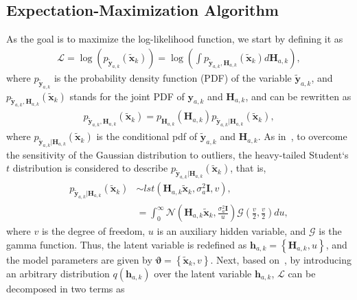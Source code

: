 \documentclass[conference,twocolumn,a4paper]{IEEEtran}
\theoremstyle{remark} \newtheorem{remark}{Remark}
\begin{document}
\subsection{Expectation-Maximization Algorithm}
As the goal is to maximize the log-likelihood function, we start by defining it as
\begin{align}\label{eq:likelihood}
    \mathcal{L}\!=\!\log \left(p_{\tilde{\mathbf{y}}_{a,k}}\!({\tilde{\mathbf{x}}_k})\right)\!=\!\log\!\!\left(\int\!\! p_{\tilde{\mathbf{y}}_{a,k},\mathbf{H}_{a,k}}\!(\tilde{\mathbf{x}}_{k}) d\mathbf{H}_{a,k}\right), 
\end{align}
where $p_{\tilde{\mathbf{y}}_{a,k}}$ is the probability density function (PDF) of the variable $\tilde{\mathbf{y}}_{a,k}$, and $p_{\tilde{\mathbf{y}}_{a,k},\mathbf{H}_{a,k}}\!(\tilde{\mathbf{x}}_{k})$ stands for the joint PDF of $\mathbf{y}_{a,k}$ and $\mathbf{H}_{a,k}$, and can be rewritten as
\begin{align}
   p_{\tilde{\mathbf{y}}_{a,k},\mathbf{H}_{a,k}}\!(\tilde{\mathbf{x}}_{k}) = p_{\mathbf{H}_{a,k}}\!(\mathbf{H}_{a,k})p_{\tilde{\mathbf{y}}_{a,k}|\mathbf{H}_{a,k}}\!(\tilde{\mathbf{x}}_{k}),
\end{align}
where $p_{\tilde{\mathbf{y}}_{a,k}|\mathbf{H}_{a,k}}\!(\tilde{\mathbf{x}}_{k})$ is the conditional pdf of $\tilde{\mathbf{y}}_{a,k}$ and $\mathbf{H}_{a,k}$. As in~\cite{9882359}, to overcome the sensitivity of the Gaussian distribution to outliers, the heavy-tailed Student`s $t$ distribution is considered to describe $p_{\tilde{\mathbf{y}}_{a,k}|\mathbf{H}_{a,k}}\!(\tilde{\mathbf{x}}_{k})$, that is,
\begin{align}\label{eq:student}
    p_{\tilde{\mathbf{y}}_{a,k}|\mathbf{H}_{a,k}}\!(\tilde{\mathbf{x}}_{k})\!&\sim\!lst\left(\mathbf{H}_{a,k}\tilde{\mathbf{x}}_k, \sigma_{a}^2 \mathbf{I}, v\right),\nonumber\\
    &=\!\int_{0}^{\infty}\!\!\mathcal{N}\!\left(\!\mathbf{H}_{a,k}\tilde{\mathbf{x}}_{k}, \frac{\sigma_{a}^2 \mathbf{I}}{u}\!\right)\!\mathcal{G}\!\left(\!\frac{v}{2}, \frac{v}{2}\!\right)\!d u,
\end{align}
where $v$ is the degree of freedom, $u$ is an auxiliary hidden variable, and $\mathcal{G}$ is the gamma function. Thus, the latent variable is redefined as $\mathbf{h}_{a,k}=\left\{\mathbf{H}_{a,k}, u \right\}$, and the model parameters are given by $\mathbf{\vartheta}=\left\{\tilde{\mathbf{x}}_{k}, v\right\}$. Next, based on~\cite{art:em}, by introducing an arbitrary distribution $q(\mathbf{h}_{a,k})$ over the latent variable $\mathbf{h}_{a,k}$, $\mathcal{L}$ can be decomposed in two terms as
\end{document}
